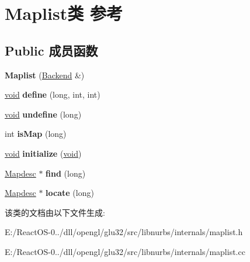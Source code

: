\hypertarget{class_maplist}{}\section{Maplist类 参考}
\label{class_maplist}
\subsection*{Public 成员函数}
\begin{DoxyCompactItemize}
\item 
\mbox{\label{class_maplist_ab3be024431fe85659410cf0479438094}} 
{\bfseries Maplist} (\hyperlink{class_backend}{Backend} \&)
\item 
\mbox{\label{class_maplist_abb8059880a603f21d09e85bc706185bf}} 
\hyperlink{interfacevoid}{void} {\bfseries define} (long, int, int)
\item 
\mbox{\label{class_maplist_a2b616a7e269a6bc7ae2845c85d334bfe}} 
\hyperlink{interfacevoid}{void} {\bfseries undefine} (long)
\item 
\mbox{\label{class_maplist_a1148c5684ab6500d59047eb6ae282812}} 
int {\bfseries is\+Map} (long)
\item 
\mbox{\label{class_maplist_a4a35fd3d4b4a1554dc9c84b6bc4945c7}} 
\hyperlink{interfacevoid}{void} {\bfseries initialize} (\hyperlink{interfacevoid}{void})
\item 
\mbox{\label{class_maplist_a25db805451d18b1815500f85b4e643fe}} 
\hyperlink{class_mapdesc}{Mapdesc} $\ast$ {\bfseries find} (long)
\item 
\mbox{\label{class_maplist_a30e313a9c4a30fdcce8505e6928e00b5}} 
\hyperlink{class_mapdesc}{Mapdesc} $\ast$ {\bfseries locate} (long)
\end{DoxyCompactItemize}


该类的文档由以下文件生成\+:\begin{DoxyCompactItemize}
\item 
E\+:/\+React\+O\+S-\/0../dll/opengl/glu32/src/libnurbs/internals/maplist.\+h\item 
E\+:/\+React\+O\+S-\/0../dll/opengl/glu32/src/libnurbs/internals/maplist.\+cc\end{DoxyCompactItemize}
